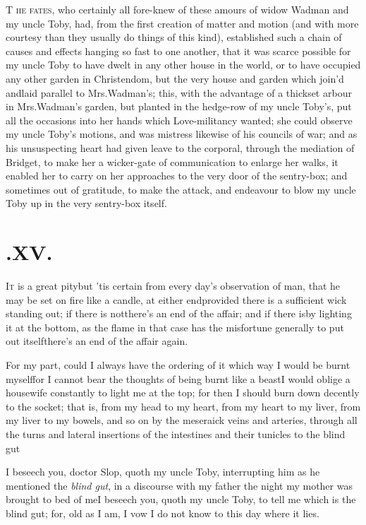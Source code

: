 \documentclass{article}
\begin{document}
\lettrine{T}{ he fates}, who certainly all
fore-knew of these amours of widow Wadman and my uncle
Toby, had, from the first creation of matter and motion (and
with more courtesy than they usually do things of this kind),
established such a chain of causes and effects hanging so fast to
one another, that it was scarce possible for my uncle Toby
to have dwelt in any other house in the world, or to have occupied
any other garden in Christendom, but the very house and
garden which join’d and\pb laid parallel to Mrs.\@ Wadman’s; this, with the advantage of a thickset
arbour in Mrs.\@ Wadman’s garden, but planted in the
hedge-row of my uncle Toby’s, put all the occasions
into her hands which Love-militancy wanted; she could observe my uncle Toby’s motions, and
was mistress likewise of his councils of war; and as his
unsuspecting heart had given leave to the corporal, through the
mediation of Bridget, to make her a wicker-gate of
communication to enlarge her walks, it enabled her to carry on her
approaches to the very door of the sentry-box; and sometimes out of
gratitude, to make the attack, and endeavour to blow my uncle
Toby up in the very sentry-box itself.

\section{.\enspace XV.}

\lettrine{I}{t} is a great pity\tsh but
’tis certain from every day’s observation of man, that
he may be set on fire like a candle, at either end\tsk provided
there is a sufficient wick standing out; if there is
not\break\tsk there’s an end of the affair; and if there
is\tsk by lighting it at the bottom, as the flame in that case
has the misfortune generally to put out itself\tsk there’s
an end of the affair again.

For my part, could I always have the ordering of it which way I
would be burnt myself\tsk for I cannot bear the thoughts of being
burnt like a beast\tsk\break I would oblige a housewife constantly to\pb
light me at the top; for then I should burn down decently to the
socket; that is, from my head to my heart, from my heart to my
liver, from my liver to my bowels, and so on by the meseraick veins
and arteries, through all the turns and lateral insertions of the
intestines and\break
their tunicles to the blind gut\tsh

\noindent
\tsh I beseech you, doctor Slop, quoth my uncle
Toby, interrupting him as he mentioned the \textit{blind gut},
in a discourse with my father the night my mother was brought to
bed of me\tsh I beseech you, quoth my uncle Toby,
to tell me which is the blind gut; for, old as I am, I vow I do not
know to this day where it lies.
\end{document}

